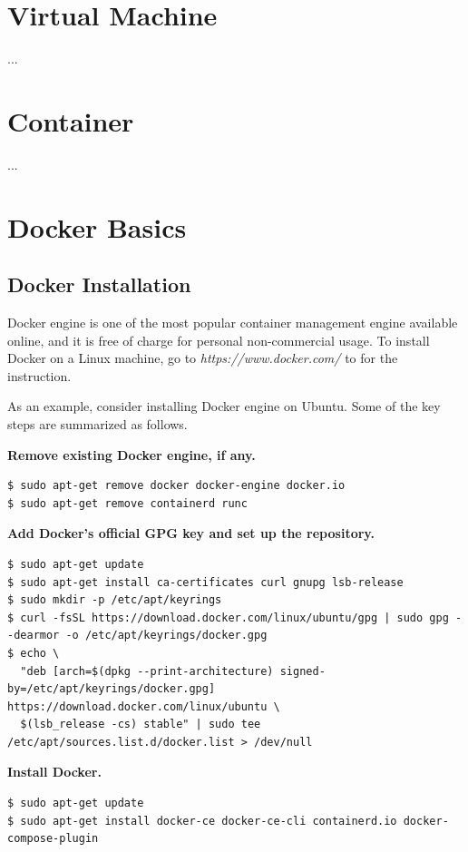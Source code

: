 \section{Virtual Machine}
...
\section{Container}
...
\section{Docker Basics} \label{ch:vac:sec:db}

\subsection{Docker Installation}

Docker engine is one of the most popular container management engine available online, and it is free of charge for personal non-commercial usage. To install Docker on a Linux machine, go to \textit{https://www.docker.com/} to for the instruction.

As an example, consider installing Docker engine on Ubuntu. Some of the key steps are summarized as follows.

\vspace{0.1in}
\noindent \textbf{Remove existing Docker engine, if any.}
\begin{lstlisting}
$ sudo apt-get remove docker docker-engine docker.io
$ sudo apt-get remove containerd runc
\end{lstlisting}

\vspace{0.1in}
\noindent \textbf{Add Docker's official GPG key and set up the repository.}
\begin{lstlisting}
$ sudo apt-get update
$ sudo apt-get install ca-certificates curl gnupg lsb-release
$ sudo mkdir -p /etc/apt/keyrings
$ curl -fsSL https://download.docker.com/linux/ubuntu/gpg | sudo gpg --dearmor -o /etc/apt/keyrings/docker.gpg
$ echo \
  "deb [arch=$(dpkg --print-architecture) signed-by=/etc/apt/keyrings/docker.gpg] https://download.docker.com/linux/ubuntu \
  $(lsb_release -cs) stable" | sudo tee /etc/apt/sources.list.d/docker.list > /dev/null
\end{lstlisting}

\vspace{0.1in}
\noindent \textbf{Install Docker.}
\begin{lstlisting}
$ sudo apt-get update
$ sudo apt-get install docker-ce docker-ce-cli containerd.io docker-compose-plugin
\end{lstlisting}

